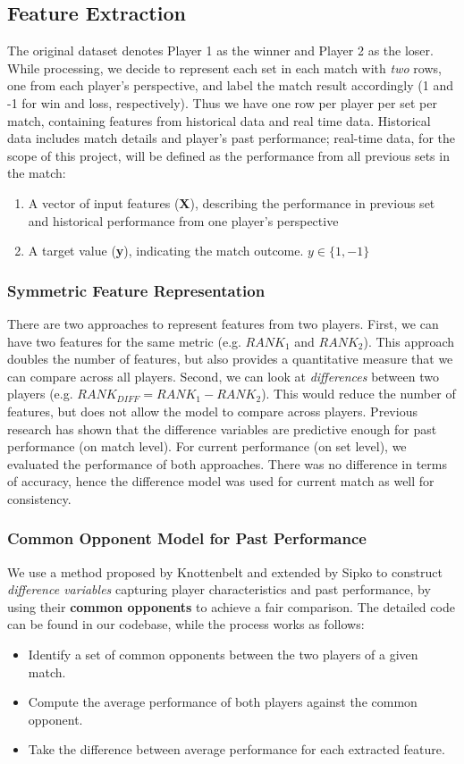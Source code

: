 \documentclass[paper=a4, fontsize=10pt]{scrartcl} %
\numberwithin{equation}{section} %
\numberwithin{figure}{section} %
\numberwithin{table}{section} %
\begin{document}
\subsection{Feature Extraction}
\label{sec:label}
The original dataset denotes Player 1 as the winner and Player 2 as the loser. While processing, we decide to represent each set in each match with \textit{two} rows, one from each player's perspective, and label the match result accordingly (1 and -1 for win and loss, respectively). Thus we have one row per player per set per match, containing features from historical data and real time data. Historical data includes match details and player's past performance; real-time data, for the scope of this project, will be defined as the performance from all previous sets in the match:
\begin{enumerate}
\item A vector of input features (\textbf{X}), describing the performance in previous set and historical performance from one player's perspective
\item A target value (\textbf{y}), indicating the match outcome. $y \in \{1,-1\}$
\end{enumerate}
\subsubsection{Symmetric Feature Representation}
There are two approaches to represent features from two players.  First, we can have two features for the same metric (e.g. $RANK_1$ and $RANK_2$).  This approach doubles the number of features, but also provides a quantitative measure that we can compare across all players.  Second, we can look at \textit{differences} between two players (e.g. $RANK_{DIFF} = RANK_1 - RANK_2$).  This would reduce the number of features, but does not allow the model to compare across players.  Previous research has shown that the difference variables are predictive enough \cite{tennis1} \cite{omalley} for past performance (on match level).  For current performance (on set level), we evaluated the performance of both approaches. There was no difference in terms of accuracy, hence the difference model was used for current match as well for consistency.
\subsubsection{Common Opponent Model for Past Performance}
We use a method proposed by Knottenbelt \cite{KNOTTENBELT20123820} and extended by Sipko \cite{tennis1} to construct \textit{difference variables} capturing player characteristics and past performance, by using their \textbf{common opponents} to achieve a fair comparison. The detailed code can be found in our codebase, while the process works as follows: 
\begin{itemize}
\item Identify a set of common opponents between the two players of a given match.
\item Compute the average performance of both players against the common opponent.
\item Take the difference between average performance for each extracted feature.
\end{itemize}
\end{document}
